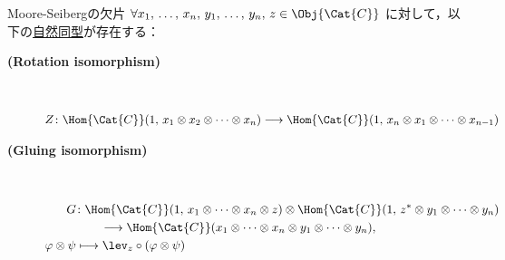 \documentclass[TQFT_main]{subfiles}
\begin{document}
\begin{mylem}[label=lem:MS]{Moore-Seibergの欠片}
    $\forall x_1,\, \dots,\, x_n,\, y_1,\, \dots,\, y_n,\, z \in \Obj{\Cat{C}}$ に対して，以下の\hyperref[def:nat]{自然同型}が存在する：
    \begin{description}
        \item[\textbf{(Rotation isomorphism)}]　 
        
        \begin{align}
            Z \colon \Hom{\Cat{C}} (1,\, x_1 \otimes x_2 \otimes \cdots \otimes x_n) \lto \Hom{\Cat{C}} (1,\, x_n \otimes x_1 \otimes \cdots \otimes x_{n-1})
        \end{align}
        
        \item[\textbf{(Gluing isomorphism)}]　
        
        \begin{align}
            G &\colon \Hom{\Cat{C}} (1,\, x_1 \otimes \cdots \otimes x_n \otimes z) \otimes  \Hom{\Cat{C}}(1,\, z^* \otimes y_1 \otimes \cdots \otimes y_n) \\
            &\qquad \lto \Hom{\Cat{C}} (x_1\otimes \cdots \otimes x_{n} \otimes y_1 \otimes \cdots \otimes y_n), \\
            \varphi \otimes \psi &\lmto \lev_z \circ (\varphi \otimes \psi)
        \end{align}
        
    \end{description}
    
\end{mylem}
\end{document}

